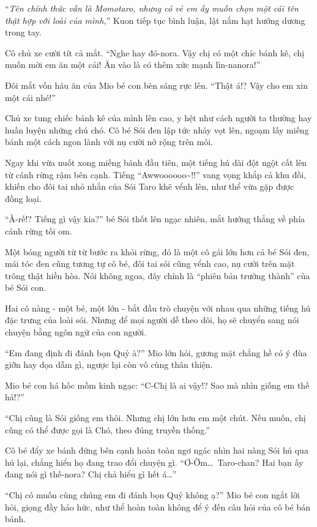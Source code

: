 \documentclass[../main.tex]{subfiles}
\begin{document}
``\textit{Tên chính thức vẫn là Momotaro, nhưng có vẻ em ấy muốn chọn một cái tên thật hợp với loài của mình,}'' Kuon tiếp tục bình luận, lật nắm hạt hướng dương trong tay.

Cô chủ xe cười tít cả mắt. ``Nghe hay đó-nora. Vậy chị có một chíc bánh kê, chị muốn mời em ăn một cái! Ăn vào là có thêm xức mạnh lìn-nanora!''

Đôi mắt vốn háu ăn của Mio bé con bèn sáng rực lên. ``Thật á!? Vậy cho em xin một cái nhé!''

Chủ xe tung chiếc bánh kê của mình lên cao, y hệt như cách người ta thường hay huấn luyện những chú chó. Cô bé Sói đen lập tức nhảy vọt lên, ngoạm lấy miếng bánh một cách ngon lành với nụ cười nở rộng trên môi.

Ngay khi vừa nuốt xong miếng bánh đầu tiên, một tiếng hú dài đột ngột cất lên từ cánh rừng rậm bên cạnh. Tiếng ``Awwoooooo\~{}!!'' vang vọng khắp cả khu đồi, khiến cho đôi tai nhỏ nhắn của Sói Taro khẽ vểnh lên, như thể vừa gặp được đồng loại.

``À-rế!? Tiếng gì vậy kia?'' bé Sói thốt lên ngạc nhiên, mắt hướng thẳng về phía cánh rừng tối om.

Một bóng người từ từ bước ra khỏi rừng, đó là một cô gái lớn hơn cả bé Sói đen, mái tóc đen cũng tương tự cô bé, đôi tai sói cũng vểnh cao, nụ cười trên mặt trông thật hiền hòa. Nói không ngoa, đây chính là ``phiên bản trưởng thành'' của bé Sói con.

Hai cô nàng - một bé, một lớn - bắt đầu trò chuyện với nhau qua những tiếng hú đặc trưng của loài sói. Nhưng để mọi người dễ theo dõi, họ sẽ chuyển sang nói chuyện bằng ngôn ngữ của con người.

``Em đang định đi đánh bọn Quỷ à?'' Mio lớn hỏi, gương mặt chẳng hề có ý đùa giỡn hay dọa dẫm gì, ngược lại còn vô cùng thân thiện.

Mio bé con há hốc mồm kinh ngạc: ``C-Chị là ai vậy!? Sao mà nhìn giống em thế hả!?''

``Chị cũng là Sói giống em thôi. Nhưng chị lớn hơn em một chút. Nếu muốn, chị cũng có thể được gọi là Chó, theo đúng truyền thống.''

Cô bé đẩy xe bánh đứng bên cạnh hoàn toàn ngơ ngác nhìn hai nàng Sói hú qua hú lại, chẳng hiểu họ đang trao đổi chuyện gì. ``Ơ-Ờm\dots\ Taro-chan? Hai bạn ấy đang nói gì thế-nora? Chị chả hiểu gì hết á\dots''

``Chị có muốn cùng chúng em đi đánh bọn Quỷ không ạ?'' Mio bé con ngắt lời hỏi, giọng đầy háo hức, như thể hoàn toàn không để ý đến câu hỏi của cô bé bán bánh.
\end{document}
